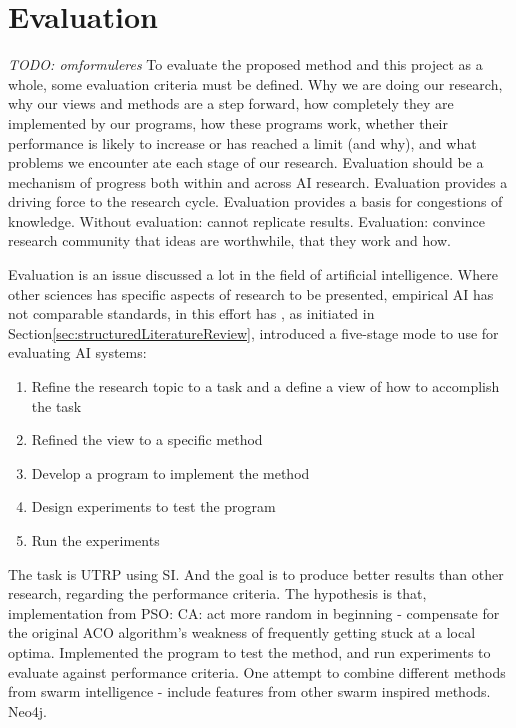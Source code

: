 \section{Evaluation}


\emph{\color{blue} TODO: omformuleres}
To evaluate the proposed method and this project as a whole, some evaluation criteria must be defined. Why we are doing our research, why our views and methods are a step forward, how completely they are implemented by our programs, how these programs work, whether their performance is likely to increase or has reached a limit (and why), and what problems we encounter ate each stage of our research. Evaluation should be a mechanism of progress both within and across AI research. Evaluation provides a driving force to the research cycle. Evaluation provides a basis for congestions of knowledge. Without evaluation: cannot replicate results. Evaluation: convince research community that ideas are worthwhile, that they work and how. 

Evaluation is an issue discussed a lot in the field of artificial intelligence. Where other sciences has specific aspects of research to be presented, empirical AI has not comparable standards, in this effort has \citet{cohen88}, as initiated in Section\vref{sec:structuredLiteratureReview}, introduced a five-stage mode to use for evaluating AI systems: 
\begin{enumerate}
\item Refine the research topic to a task and a define a view of how to accomplish the task
\item Refined the view to a specific method
\item Develop a program to implement the method
\item Design experiments to test the program
\item Run the experiments
\end{enumerate} 
 

The task is UTRP using SI. 
And the goal is to produce better results than other research, regarding the performance criteria.  
The hypothesis is that, implementation from PSO: CA: act more random in beginning - compensate for the original ACO algorithm's weakness of frequently getting stuck at a local optima. Implemented the program to test the method, and run experiments to evaluate against performance criteria. One attempt to combine different methods from swarm intelligence - include features from other swarm inspired methods. Neo4j.



